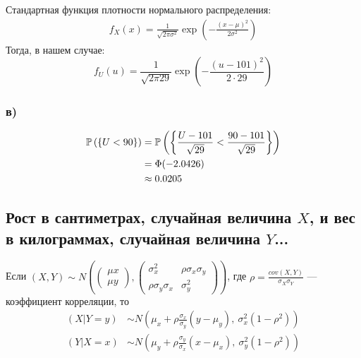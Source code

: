 \documentclass{article}
\begin{document}
Стандартная функция плотности нормального распределения:
\begin{equation*}
    \begin{aligned}
        f_X(x)=\frac{1}{\sqrt{2\pi\sigma^2}}\exp\left(-\frac{(x-\mu)^2}{2\sigma^2}\right)
    \end{aligned}
\end{equation*}
Тогда, в нашем случае:
\begin{equation*}
    f_U(u)=\frac{1}{\sqrt{2\pi 29}}\exp\left(-\frac{(u-101)^2}{2\cdot29}\right)
\end{equation*}


\subsubsection*{в)}
\begin{equation*}
    \begin{aligned}
        \mathbb{P}\left(\{U<90\}\right)&=\mathbb{P}\left(\left\{\frac{U-101}{\sqrt{29}}<\frac{90-101}{\sqrt{29}}\right\}\right)\\
        &=\Phi(-2.0426)\\
        &\approx0.0205
    \end{aligned}
\end{equation*}


\subsection{Рост в сантиметрах, случайная величина $X$, и вес в килограммах, случайная величина $Y$...}
\theorem Если $(X,Y)\sim N\left(\begin{pmatrix}
    \mu x\\
    \mu y
\end{pmatrix}, \begin{pmatrix}
    \sigma_x^2&\rho\sigma_x\sigma_y\\
    \rho\sigma_y\sigma_x&\sigma_y^2
\end{pmatrix}\right)$, где $\rho=\displaystyle\frac{cov(X,Y)}{\sigma_X\sigma_Y}$ — коэффициент корреляции, то 
\begin{equation*}
    \begin{aligned}
        (X|Y=y)&\sim N\left(\mu_x+\rho\frac{\sigma_x}{\sigma_y}(y-\mu_y),\ \sigma_x^2\left(1-\rho^2\right)\right)\\
        (Y|X=x)&\sim N\left(\mu_y+\rho\frac{\sigma_y}{\sigma_x}(x-\mu_x),\ \sigma_y^2\left(1-\rho^2\right)\right)
    \end{aligned}
\end{equation*}
\end{document}
